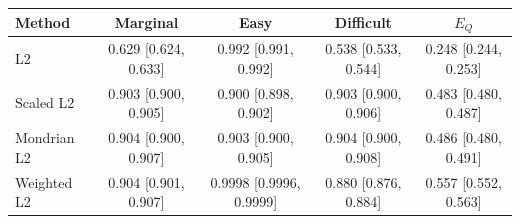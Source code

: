 \begin{tabular}{lcccc}
\toprule
Method & Marginal & Easy & Difficult & $E_Q$ \\
\midrule
L2 & 0.629 [0.624, 0.633] & 0.992 [0.991, 0.992] & 0.538 [0.533, 0.544] & 0.248 [0.244, 0.253] \\
Scaled L2 & 0.903 [0.900, 0.905] & 0.900 [0.898, 0.902] & 0.903 [0.900, 0.906] & 0.483 [0.480, 0.487] \\
Mondrian L2 & 0.904 [0.900, 0.907] & 0.903 [0.900, 0.905] & 0.904 [0.900, 0.908] & 0.486 [0.480, 0.491] \\
Weighted L2 & 0.904 [0.901, 0.907] & 0.9998 [0.9996, 0.9999] & 0.880 [0.876, 0.884] & 0.557 [0.552, 0.563] \\
\bottomrule
\end{tabular}
